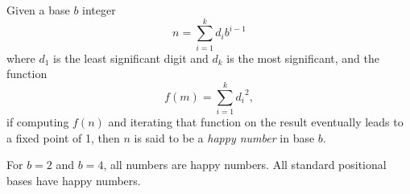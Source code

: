 \documentclass[12pt]{article}
\begin{document}
Given a base $b$ integer $$n = \sum_{i = 1}^k d_ib^{i - 1}$$ where $d_1$ is the least significant digit and $d_k$ is the most significant, and the function $$f(m) = \sum_{i = 1}^k {d_i}^2,$$ if computing $f(n)$ and iterating that function on the result eventually leads to a fixed point of 1, then $n$ is said to be a {\em happy number} in base $b$.

For $b = 2$ and $b = 4$, all numbers are happy numbers. All standard positional bases have happy numbers.
\end{document}
